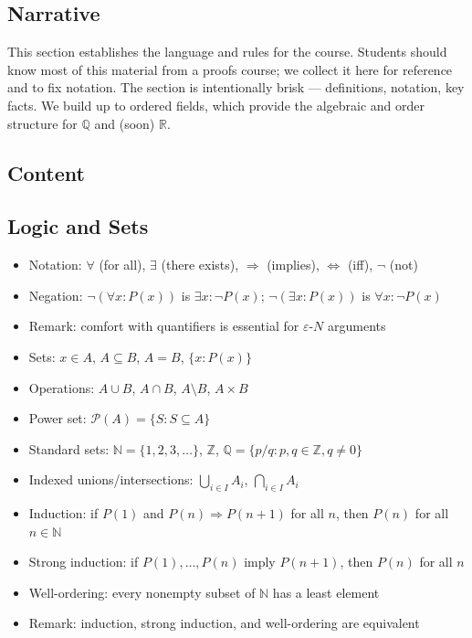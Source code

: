 \documentclass[
  10pt,
  letterpaper,
]{scrbook}
\providecommand{\tightlist}{%
  \setlength{\itemsep}{0pt}\setlength{\parskip}{0pt}}
\newcommand{\ZZ}{\mathbb{Z}}
\newcommand{\NN}{\mathbb{N}}
\newcommand{\QQ}{\mathbb{Q}}
\begin{document}
\subsection{Narrative}\label{narrative}

This section establishes the language and rules for the course. Students
should know most of this material from a proofs course; we collect it
here for reference and to fix notation. The section is intentionally
brisk --- definitions, notation, key facts. We build up to ordered
fields, which provide the algebraic and order structure for
\(\mathbb{Q}\) and (soon) \(\mathbb{R}\).

\subsection{Content}\label{content}

\subsection{Logic and Sets}\label{logic-and-sets}

\begin{itemize}
\tightlist
\item
  Notation: \(\forall\) (for all), \(\exists\) (there exists),
  \(\Rightarrow\) (implies), \(\Leftrightarrow\) (iff), \(\neg\) (not)
\item
  Negation: \(\neg(\forall x: P(x))\) is \(\exists x: \neg P(x)\);
  \(\neg(\exists x: P(x))\) is \(\forall x: \neg P(x)\)
\item
  Remark: comfort with quantifiers is essential for
  \(\varepsilon\)-\(N\) arguments
\item
  Sets: \(x \in A\), \(A \subseteq B\), \(A = B\), \(\{x : P(x)\}\)
\item
  Operations: \(A \cup B\), \(A \cap B\), \(A \setminus B\),
  \(A \times B\)
\item
  Power set: \(\mathcal{P}(A) = \{S : S \subseteq A\}\)
\item
  Standard sets: \(\NN = \{1, 2, 3, \ldots\}\), \(\ZZ\),
  \(\QQ = \{p/q : p, q \in \ZZ, q \neq 0\}\)
\item
  Indexed unions/intersections: \(\bigcup_{i \in I} A_i\),
  \(\bigcap_{i \in I} A_i\)
\item
  Induction: if \(P(1)\) and \(P(n) \Rightarrow P(n+1)\) for all \(n\),
  then \(P(n)\) for all \(n \in \NN\)
\item
  Strong induction: if \(P(1), \ldots, P(n)\) imply \(P(n+1)\), then
  \(P(n)\) for all \(n\)
\item
  Well-ordering: every nonempty subset of \(\NN\) has a least element
\item
  Remark: induction, strong induction, and well-ordering are equivalent
\end{itemize}
\end{document}

